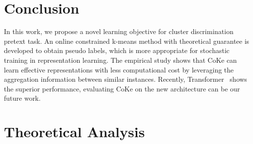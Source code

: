 \documentclass[10pt,twocolumn,letterpaper]{article}
\begin{document}
\section{Conclusion}\label{sec:conclude}
In this work, we propose a novel learning objective for cluster discrimination pretext task. An online constrained k-means method with theoretical guarantee is developed to obtain pseudo labels, which is more appropriate for stochastic training in representation learning. The empirical study shows that CoKe can learn effective representations with less computational cost by leveraging the aggregation information between similar instances. Recently, Transformer~\cite{DosovitskiyB0WZ21} shows the superior performance, evaluating CoKe on the new architecture can be our future work.

{\small


}

\appendix

\section{Theoretical Analysis}
\end{document}
